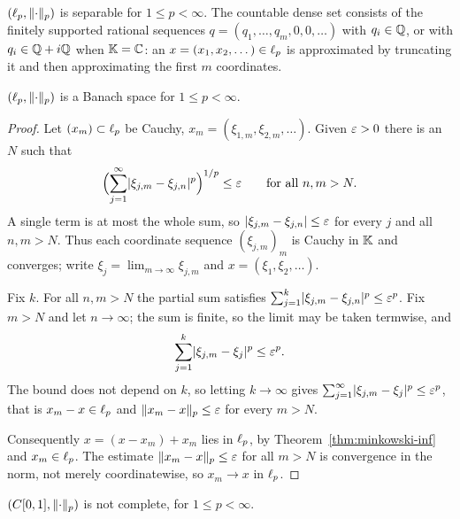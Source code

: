 \begin{example}\label{ex:lp-sep}
$(\ell_{p}, \lVert\cdot\rVert_p)$ is separable for $1 \le p < \infty$. The countable
dense set consists of the finitely supported rational sequences
$q = (q_1, \dots, q_m, 0, 0, \dots)$ with $q_i \in \mathbb{Q}$, or with
$q_i \in \mathbb{Q} + i\mathbb{Q}$ when $\mathbb{K} = \mathbb{C}$: an $x = (x_1, x_2, \dots) \in \ell_{p}$ is
approximated by truncating it and then approximating the first $m$
coordinates.
\end{example}

\begin{theorem}\label{thm:lp-banach}
$(\ell_{p}, \lVert\cdot\rVert_p)$ is a Banach space for $1 \le p < \infty$.
\end{theorem}

\begin{proof}
Let $(x_m) \subset \ell_{p}$ be Cauchy, $x_m = (\xi_{1,m}, \xi_{2,m}, \dots)$.
Given $\varepsilon > 0$ there is an $N$ such that
\[
  \Bigl(\sum_{j=1}^{\infty} \lvert\xi_{j,m} - \xi_{j,n}\rvert^p\Bigr)^{1/p}
  \le \varepsilon \qquad \text{for all } n, m > N .
\]
A single term is at most the whole sum, so
$\lvert\xi_{j,m} - \xi_{j,n}\rvert \le \varepsilon$ for every $j$ and all $n,m > N$. Thus
each coordinate sequence $(\xi_{j,m})_m$ is Cauchy in $\mathbb{K}$ and converges;
write $\xi_j = \lim_{m \to \infty} \xi_{j,m}$ and
$x = (\xi_1, \xi_2, \dots)$.

Fix $k$. For all $n, m > N$ the partial sum satisfies
$\sum_{j=1}^{k} \lvert\xi_{j,m} - \xi_{j,n}\rvert^p \le \varepsilon^p$. Fix $m > N$ and let
$n \to \infty$; the sum is finite, so the limit may be taken termwise, and
\[
  \sum_{j=1}^{k} \lvert\xi_{j,m} - \xi_j\rvert^p \le \varepsilon^p .
\]
The bound does not depend on $k$, so letting $k \to \infty$ gives
$\sum_{j=1}^{\infty} \lvert\xi_{j,m} - \xi_j\rvert^p \le \varepsilon^p$, that is
$x_m - x \in \ell_{p}$ and $\lVert x_m - x\rVert_p \le \varepsilon$ for every $m > N$.

Consequently $x = (x - x_m) + x_m$ lies in $\ell_{p}$, by
Theorem~\ref{thm:minkowski-inf} and $x_m \in \ell_{p}$. The estimate
$\lVert x_m - x\rVert_p \le \varepsilon$ for all $m > N$ is convergence in the norm, not
merely coordinatewise, so $x_m \to x$ in $\ell_{p}$.
\end{proof}

\begin{counterexample}\label{cex:Cp-not-banach}
$(C[0,1], \lVert\cdot\rVert_p)$ is not complete, for $1 \le p < \infty$.
\end{counterexample}

